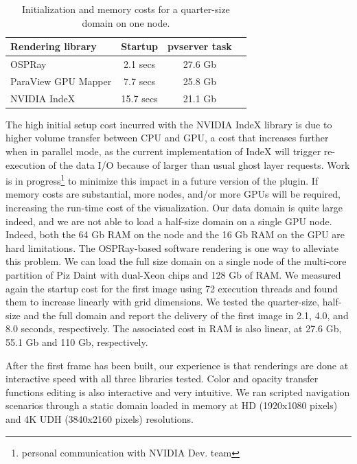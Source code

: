 \documentclass[final,5p,times,twocolumn]{elsarticle}
\begin{document}
\begin{table}[htb]
  \centering
  \caption{
    Initialization and memory costs for a quarter-size domain on one node.
  }
  \label{tab:firstframe-tab}

  \begin{tabular}{lccc}
    \hline
    Rendering library & Startup & pvserver task\\
    \hline
    OSPRay & 2.1 secs &  27.6 Gb \\
    ParaView GPU Mapper & 7.7 secs &  25.8 Gb \\
    NVIDIA IndeX & 15.7 secs &  21.1 Gb\\
    \hline

  \end{tabular}
\end{table}

The high initial setup cost incurred with the NVIDIA IndeX library is due to higher volume transfer between CPU and GPU, a cost that increases further when in parallel mode, as the current
implementation of IndeX will trigger re-execution of the data I/O because of larger than usual ghost layer requests. Work is in progress\footnote{personal communication with NVIDIA Dev. team} to minimize this impact in a future version of the plugin.
\newline
If memory costs are substantial, more nodes, and/or more GPUs will be required,
increasing the run-time cost of the visualization. Our data domain is quite large
indeed, and we are not able to load a half-size domain on a single GPU node. Indeed, both
the 64 Gb RAM on the node and the 16 Gb RAM on the GPU are hard limitations. The OSPRay-based software rendering is one way to alleviate this problem. We can load the full size
domain on a single node of  the multi-core partition of Piz Daint with dual-Xeon
chips and 128 Gb of RAM. We measured again the startup cost for the first image
using 72 execution threads and found them to increase linearly with grid dimensions.
We tested the quarter-size, half-size and the full domain and report the delivery
of the first image in 2.1, 4.0, and 8.0 seconds, respectively. The associated cost
in RAM is also linear, at 27.6 Gb, 55.1 Gb and 110 Gb, respectively.
 
After the first frame has been built, our experience is that renderings
are done at interactive speed with all three libraries tested.
Color and opacity transfer functions editing is also interactive and very intuitive.
 We ran scripted navigation scenarios through a static domain loaded in memory
at HD (1920x1080 pixels) and 4K UDH (3840x2160 pixels) resolutions.
\end{document}
